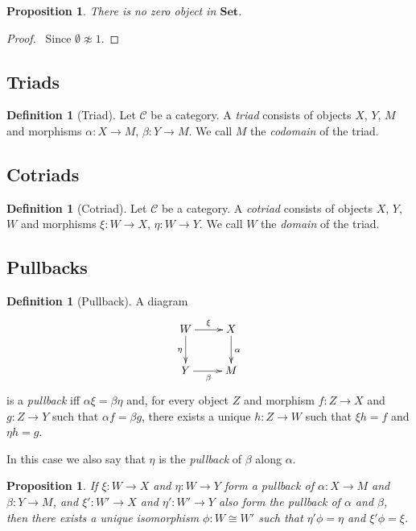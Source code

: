 \documentclass{book}
\let\qed\relax
\newtheorem{prop}[ax]{Proposition}
\theoremstyle{definition}
\newtheorem{df}[ax]{Definition}
\newcommand{\Set}{\ensuremath{\mathbf{Set}}}
\begin{document}
\begin{prop}
There is no zero object in $\Set$.
\end{prop}

\begin{proof}
\pf\ Since $\emptyset \not\approx 1$. \qed
\end{proof}

\subsection{Triads}

\begin{df}[Triad]
Let $\mathcal{C}$ be a category. A \emph{triad} consists of objects $X$, $Y$, $M$ and morphisms $\alpha : X \rightarrow M$, $\beta : Y \rightarrow M$. We call $M$ the \emph{codomain} of the triad.
\end{df}

\subsection{Cotriads}

\begin{df}[Cotriad]
Let $\mathcal{C}$ be a category. A \emph{cotriad} consists of objects $X$, $Y$, $W$ and morphisms $\xi : W \rightarrow X$, $\eta : W \rightarrow Y$. We call $W$ the \emph{domain} of the triad.
\end{df}

\subsection{Pullbacks}

\begin{df}[Pullback]
A diagram
\[ \xymatrix{
W \ar[r]^\xi \ar[d]_\eta & X \ar[d]^\alpha \\
Y \ar[r]_\beta & M
} \]
is a \emph{pullback} iff $\alpha \xi = \beta \eta$ and, for every object $Z$ and morphism $f : Z \rightarrow X$ and $g : Z \rightarrow Y$ such that $\alpha f = \beta g$, there exists a unique $h : Z \rightarrow W$ such that $\xi h = f$ and $\eta h = g$.

In this case we also say that $\eta$ is the \emph{pullback} of $\beta$ along $\alpha$.
\end{df}

\begin{prop}
\label{prop:pullback_unique}
If $\xi : W \rightarrow X$ and $\eta : W \rightarrow Y$ form a pullback of $\alpha : X \rightarrow M$ and $\beta : Y \rightarrow M$, and $\xi' : W' \rightarrow X$ and $\eta' : W' \rightarrow Y$ also form the pullback of $\alpha$ and $\beta$, then there exists a unique isomorphism $\phi : W \cong W'$ such that $\eta' \phi = \eta$ and $\xi' \phi = \xi$.
\end{prop}
\end{document}
